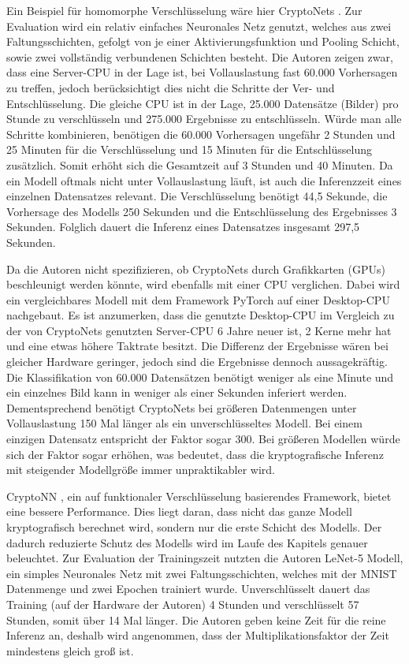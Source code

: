 Ein Beispiel für homomorphe Verschlüsselung wäre hier CryptoNets \cite{P-54}.
Zur Evaluation wird ein relativ einfaches Neuronales Netz genutzt, welches aus zwei Faltungsschichten, gefolgt von je einer Aktivierungsfunktion und Pooling Schicht, sowie zwei vollständig verbundenen Schichten besteht.
Die Autoren zeigen zwar, dass eine Server-CPU in der Lage ist, bei Vollauslastung fast 60.000 Vorhersagen zu treffen, jedoch berücksichtigt dies nicht die Schritte der Ver- und Entschlüsselung.
Die gleiche CPU ist in der Lage, 25.000 Datensätze (Bilder) pro Stunde zu verschlüsseln und 275.000 Ergebnisse zu entschlüsseln.
Würde man alle Schritte kombinieren, benötigen die 60.000 Vorhersagen ungefähr 2 Stunden und 25 Minuten für die Verschlüsselung und 15 Minuten für die Entschlüsselung zusätzlich.
Somit erhöht sich die Gesamtzeit auf 3 Stunden und 40 Minuten.
Da ein Modell oftmals nicht unter Vollauslastung läuft, ist auch die Inferenzzeit eines einzelnen Datensatzes relevant.
Die Verschlüsselung benötigt 44,5 Sekunde, die Vorhersage des Modells 250 Sekunden und die Entschlüsselung des Ergebnisses 3 Sekunden. 
Folglich dauert die Inferenz eines Datensatzes insgesamt 297,5 Sekunden.

Da die Autoren nicht spezifizieren, ob CryptoNets durch Grafikkarten (GPUs) beschleunigt werden könnte, wird ebenfalls mit einer CPU verglichen.
Dabei wird ein vergleichbares Modell mit dem Framework PyTorch auf einer Desktop-CPU nachgebaut.
Es ist anzumerken, dass die genutzte Desktop-CPU im Vergleich zu der von CryptoNets genutzten Server-CPU 6 Jahre neuer ist, 2 Kerne mehr hat und eine etwas höhere Taktrate besitzt.
Die Differenz der Ergebnisse wären bei gleicher Hardware geringer, jedoch sind die Ergebnisse dennoch aussagekräftig.
Die Klassifikation von 60.000 Datensätzen benötigt weniger als eine Minute und ein einzelnes Bild kann in weniger als einer Sekunden inferiert werden.
Dementsprechend benötigt CryptoNets bei größeren Datenmengen unter Vollauslastung 150 Mal länger als ein unverschlüsseltes Modell. 
Bei einem einzigen Datensatz entspricht der Faktor sogar 300.
Bei größeren Modellen würde sich der Faktor sogar erhöhen, was bedeutet, dass die kryptografische Inferenz mit steigender Modellgröße immer unpraktikabler wird.


CryptoNN \cite{P-53}, ein auf funktionaler Verschlüsselung basierendes Framework, bietet eine bessere Performance.
Dies liegt daran, dass nicht das ganze Modell kryptografisch berechnet wird, sondern nur die erste Schicht des Modells.
Der dadurch reduzierte Schutz des Modells wird im Laufe des Kapitels genauer beleuchtet.
Zur Evaluation der Trainingszeit nutzten die Autoren LeNet-5 Modell, ein simples Neuronales Netz mit zwei Faltungsschichten, welches mit der MNIST Datenmenge\cite{D-MNIST} und zwei Epochen trainiert wurde.
Unverschlüsselt dauert das Training (auf der Hardware der Autoren) 4 Stunden und verschlüsselt 57 Stunden, somit über 14 Mal länger.
Die Autoren geben keine Zeit für die reine Inferenz an, deshalb wird angenommen, dass der Multiplikationsfaktor der Zeit mindestens gleich groß ist.

